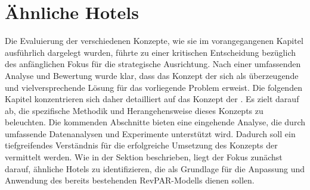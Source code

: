 \chapter{Ähnliche Hotels}
\label{chap:Similar_hotels}
Die Evaluierung der verschiedenen Konzepte, wie sie im vorangegangenen Kapitel \emph{} ausführlich dargelegt wurden, führte zu einer kritischen Entscheidung bezüglich des anfänglichen Fokus für die strategische Ausrichtung. Nach einer umfassenden Analyse und Bewertung wurde klar, dass das Konzept der \emph{} sich als überzeugende und vielversprechende Lösung für das vorliegende Problem erweist.
\newline
\newline
Die folgenden Kapitel konzentrieren sich daher detailliert auf das Konzept der \emph{}. Es zielt darauf ab, die spezifische Methodik und Herangehensweise dieses Konzepts zu beleuchten. Die kommenden Abschnitte bieten eine eingehende Analyse, die durch umfassende Datenanalysen und Experimente unterstützt wird. Dadurch soll ein tiefgreifendes Verständnis für die erfolgreiche Umsetzung des Konzepts der \emph{} vermittelt werden.
\newline
\newline
Wie in der Sektion \emph{} beschrieben, liegt der Fokus zunächst darauf, ähnliche Hotels zu identifizieren, die als Grundlage für die Anpassung und Anwendung des bereits bestehenden RevPAR-Modells dienen sollen.


